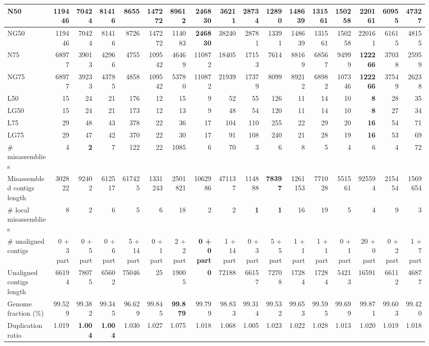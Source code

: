 \documentclass[12pt,a4paper]{article}
\begin{document}
\begin{table}[ht]
\begin{center}
\begin{tabular}{|l*{16}{|r}|}
N50 & 119446 & 70424 & 81416 & 8655 & 147272 & 89612 & {\bf 246830} & 36211 & 28734 & 12890 & 148639 & 131561 & 150258 & 220161 & 60955 & 47327 \\ \hline
NG50 & 119446 & 70424 & 81416 & 8726 & 147272 & 114083 & {\bf 246830} & 38240 & 28781 & 13391 & 148639 & 131561 & 150258 & 220161 & 61615 & 48155 \\ \hline
N75 & 68977 & 39013 & 42966 & 4755 & 109542 & 46469 & 110872 & 18405 & 17153 & 7614 & 88169 & 68567 & 94999 & {\bf 122266} & 37038 & 25959 \\ \hline
NG75 & 68977 & 39233 & 43785 & 4858 & 109542 & 53780 & 110872 & 21939 & 17379 & 8099 & 89212 & 68982 & 107346 & {\bf 122266} & 37549 & 26238 \\ \hline
L50 & 15 & 24 & 21 & 176 & 12 & 15 & 9 & 52 & 55 & 126 & 11 & 14 & 10 & {\bf 8} & 28 & 35 \\ \hline
LG50 & 15 & 24 & 21 & 173 & 12 & 13 & 9 & 48 & 54 & 120 & 11 & 14 & 10 & {\bf 8} & 27 & 34 \\ \hline
L75 & 29 & 48 & 43 & 378 & 22 & 36 & 17 & 104 & 110 & 255 & 22 & 29 & 20 & {\bf 16} & 54 & 71 \\ \hline
LG75 & 29 & 47 & 42 & 370 & 22 & 30 & 17 & 91 & 108 & 240 & 21 & 28 & 19 & {\bf 16} & 53 & 69 \\ \hline
\# misassemblies & 4 & {\bf 2} & 7 & 122 & 22 & 1085 & 6 & 70 & 3 & 6 & 8 & 5 & 4 & 6 & 4 & 72 \\ \hline
Misassembled contigs length & 302822 & 92402 & 612517 & 617425 & 1331243 & 2501821 & 1062986 & 471137 & 114888 & {\bf 78397} & 1261153 & 771028 & 551561 & 925594 & 215454 & 1569654 \\ \hline
\# local misassemblies & 8 & 2 & 6 & 5 & 6 & 18 & 2 & 2 & {\bf 1} & {\bf 1} & 16 & 19 & 5 & 4 & 9 & 3 \\ \hline
\# unaligned contigs & 0 + 3 part & 0 + 5 part & 0 + 6 part & 5 + 14 part & 0 + 1 part & 2 + 2 part & {\bf 0 + 0 part} & 1 + 14 part & 0 + 3 part & 5 + 5 part & 1 + 1 part & 1 + 1 part & 0 + 1 part & 20 + 0 part & 0 + 2 part & 1 + 7 part \\ \hline
Unaligned contigs length & 66194 & 78075 & 65602 & 75046 & 25 & 19005 & {\bf 0} & 72188 & 66157 & 72708 & 17284 & 17284 & 54213 & 16591 & 66112 & 46877 \\ \hline
Genome fraction (\%) & 99.529 & 99.382 & 99.345 & 96.629 & 99.845 & {\bf 99.879} & 99.799 & 98.833 & 99.314 & 99.532 & 99.653 & 99.595 & 99.699 & 99.871 & 99.603 & 99.420 \\ \hline
Duplication ratio & 1.019 & {\bf 1.004} & {\bf 1.004} & 1.030 & 1.027 & 1.075 & 1.018 & 1.068 & 1.005 & 1.023 & 1.022 & 1.028 & 1.013 & 1.020 & 1.019 & 1.018 \\ \hline

\end{tabular}
\end{center}
\end{table}
\end{document}
